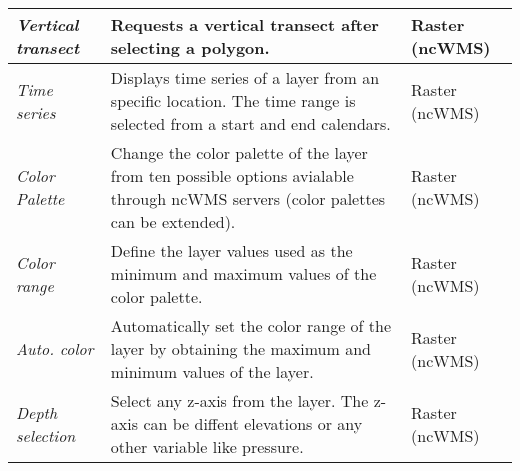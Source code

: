 \begin{table*}[h]
\begin{tabularx}{460pt}{|l|X|l|}
         \hline
         \emph{Vertical transect} & Requests a vertical transect after selecting a 
             polygon. &  Raster (ncWMS)  \\   
         \hline
         \emph{Time series} & Displays time series of a layer from an specific 
            location. The time range is selected from a start and end calendars. 
            &  Raster (ncWMS)  \\   
         \hline
         \emph{Color Palette} & Change the color palette of the layer from 
          ten possible options avialable through ncWMS servers (color palettes can be extended). & Raster (ncWMS) \\   
         \hline
         \emph{Color range} & Define the layer values used as the  minimum and 
                 maximum values of the color palette. & Raster (ncWMS) \\ 
         \hline
         \emph{Auto. color} & Automatically set the color range of the layer by
                    obtaining the maximum and minimum values of the layer. & Raster (ncWMS) \\  
        \hline
         \emph{Depth selection} & Select any z-axis from the layer. The z-axis can be
         diffent elevations or any other variable like pressure. & Raster (ncWMS) \\  
         \hline
     \end{tabularx}
     \label{tab:features}
 \end{table*}



